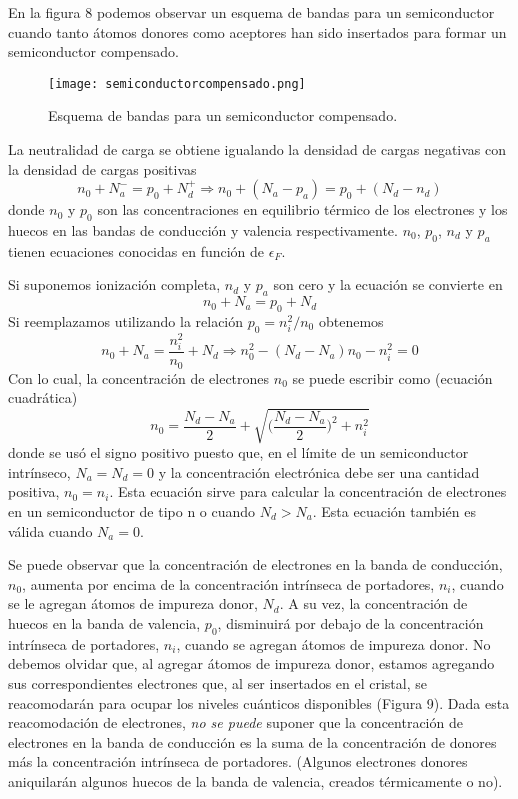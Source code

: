 \documentclass[12pt,a4paper]{article}
\begin{document}
En la figura 8 podemos observar un esquema de bandas para un semiconductor cuando tanto átomos donores como aceptores han sido insertados para formar un semiconductor compensado.

\begin{figure}[ht!]
\begin{center}
\texttt{[image: semiconductorcompensado.png]}
\caption{Esquema de bandas para un semiconductor compensado.}
\end{center}
\end{figure}

La neutralidad de carga se obtiene igualando la densidad de cargas negativas con la densidad de cargas positivas
\[ n_{0}+N_{a}^{-}=p_{0}+N_{d}^{+} \Rightarrow n_{0} + (N_{a} - p_{a}) = p_{0} + (N_{d} - n_{d}) \]
donde $n_{0}$ y $p_{0}$ son las concentraciones en equilibrio térmico de los electrones y los huecos en las bandas de conducción y valencia respectivamente. $n_{0}$, $p_{0}$, $n_{d}$ y $p_{a}$ tienen ecuaciones conocidas en función de $\epsilon _{F}$.

Si suponemos ionización completa, $n_{d}$ y $p_{a}$ son cero y la ecuación se convierte en
\[ n_{0} + N_{a} = p_{0} + N_{d} \]
Si reemplazamos utilizando la relación $p_{0}=n_{i}^{2}/n_{0}$ obtenemos
\[ n_{0} + N_{a} = \frac{n_{i}^{2}}{n_{0}} + N_{d} \Rightarrow n_{0}^{2} - (N_{d} - N_{a}) n_{0} - n_{i}^{2} = 0  \]
Con lo cual, la concentración de electrones $n_{0}$ se puede escribir como (ecuación cuadrática)
\[ n_{0} = \frac{N_{d} - N_{a}}{2} + \sqrt{ \bigg( \frac{N_{d} - N_{a}}{2} \bigg)^{2} + n_{i}^{2}} \]
donde se usó el signo positivo puesto que, en el límite de un semiconductor intrínseco, $N_{a}=N_{d}=0$ y la concentración electrónica debe ser una cantidad positiva, $n_{0}=n_{i}$. Esta ecuación sirve para calcular la concentración de electrones en un semiconductor de tipo n o cuando $N_{d}>N_{a}$. Esta ecuación también es válida cuando $N_{a}=0$.

Se puede observar que la concentración de electrones en la banda de conducción, $n_{0}$, aumenta por encima de la concentración intrínseca de portadores, $n_{i}$, cuando se le agregan átomos de impureza donor, $N_{d}$. A su vez, la concentración de huecos en la banda de valencia, $p_{0}$, disminuirá por debajo de la concentración intrínseca de portadores, $n_{i}$, cuando se agregan átomos de impureza donor. No debemos olvidar que, al agregar átomos de impureza donor, estamos agregando sus correspondientes electrones que, al ser insertados en el cristal, se reacomodarán para ocupar los niveles cuánticos disponibles (Figura 9). Dada esta reacomodación de electrones, \emph{no se puede} suponer que la concentración de electrones en la banda de conducción es la suma de la concentración de donores más la concentración intrínseca de portadores. (Algunos electrones donores aniquilarán algunos huecos de la banda de valencia, creados térmicamente o no).
\end{document}
